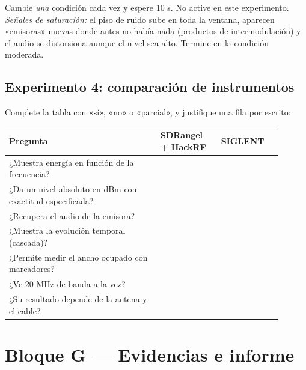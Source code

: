 Cambie \emph{una} condición cada vez y espere 10 s. No active  en este experimento. \emph{Señales de saturación:} el piso de ruido sube en toda la ventana, aparecen «emisoras» nuevas donde antes no había nada (productos de intermodulación) y el audio se distorsiona aunque el nivel sea alto. Termine en la condición moderada.

\subsection{Experimento 4: comparación de instrumentos}

Complete la tabla con «sí», «no» o «parcial», y justifique una fila por escrito:

\begin{longtable}{@{}p{0.50\linewidth}p{0.20\linewidth}p{0.20\linewidth}@{}}
\toprule
\textbf{Pregunta} & \textbf{SDRangel + HackRF} & \textbf{SIGLENT} \\
\midrule
\endhead
¿Muestra energía en función de la frecuencia? & & \\
¿Da un nivel absoluto en dBm con exactitud especificada? & & \\
¿Recupera el audio de la emisora? & & \\
¿Muestra la evolución temporal (cascada)? & & \\
¿Permite medir el ancho ocupado con marcadores? & & \\
¿Ve 20 MHz de banda a la vez? & & \\
¿Su resultado depende de la antena y el cable? & & \\
\bottomrule
\end{longtable}

\section{Bloque G --- Evidencias e informe}
\label{sec:w-evid}

